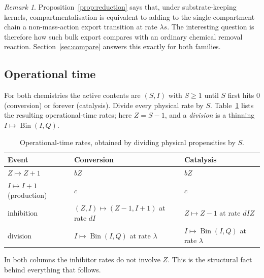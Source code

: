 \documentclass[11pt,a4paper]{article}
\numberwithin{equation}{section}
\theoremstyle{definition}\newtheorem{definition}[theorem]{Definition}
\theoremstyle{remark}\newtheorem{remark}[theorem]{Remark}\newtheorem{example}[theorem]{Example}
\newcommand{\Bin}{\operatorname{Bin}}
\begin{document}
\begin{remark}\label{rem:mass-action-emulation}
Proposition~\ref{prop:reduction} says that, under substrate-keeping kernels, compartmentalisation is equivalent to adding to the single-compartment chain a non-mass-action export transition at rate $\lambda s$. The interesting question is therefore how such bulk export compares with an ordinary chemical removal reaction. Section~\ref{sec:compare} answers this exactly for both families.
\end{remark}

\subsection{Operational time}\label{sec:optime}
For both chemistries the active contents are $(S,I)$ with $S\ge1$ until $S$ first hits $0$ (conversion) or forever (catalysis). Divide every physical rate by $S$. Table~\ref{tab:optime} lists the resulting operational-time rates; here $Z=S-1$, and a \emph{division} is a thinning $I\mapsto\Bin(I,Q)$.

\begin{table}[ht]
\centering\small
\caption{Operational-time rates, obtained by dividing physical propensities by $S$.}\label{tab:optime}
\begin{tabular}{@{}lll@{}}
\toprule
Event & Conversion & Catalysis\\
\midrule
$Z\mapsto Z+1$ & $bZ$ & $bZ$\\
$I\mapsto I+1$ (production) & $c$ & $c$\\
inhibition & $(Z,I)\mapsto(Z-1,I+1)$ at rate $dI$ & $Z\mapsto Z-1$ at rate $dIZ$\\
division & $I\mapsto\Bin(I,Q)$ at rate $\lambda$ & $I\mapsto\Bin(I,Q)$ at rate $\lambda$\\
\bottomrule
\end{tabular}
\end{table}

In both columns the inhibitor rates do not involve $Z$. This is the structural fact behind everything that follows.
\end{document}
